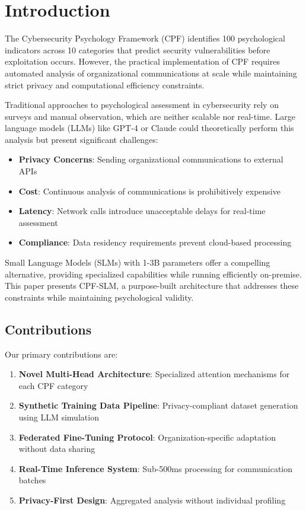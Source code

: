 \documentclass[11pt,a4paper]{article}
\begin{document}
\vspace{1cm}

\section{Introduction}

The Cybersecurity Psychology Framework (CPF) identifies 100 psychological indicators across 10 categories that predict security vulnerabilities before exploitation occurs. However, the practical implementation of CPF requires automated analysis of organizational communications at scale while maintaining strict privacy and computational efficiency constraints.

Traditional approaches to psychological assessment in cybersecurity rely on surveys and manual observation, which are neither scalable nor real-time. Large language models (LLMs) like GPT-4 or Claude could theoretically perform this analysis but present significant challenges:

\begin{itemize}
\item \textbf{Privacy Concerns}: Sending organizational communications to external APIs
\item \textbf{Cost}: Continuous analysis of communications is prohibitively expensive
\item \textbf{Latency}: Network calls introduce unacceptable delays for real-time assessment
\item \textbf{Compliance}: Data residency requirements prevent cloud-based processing
\end{itemize}

Small Language Models (SLMs) with 1-3B parameters offer a compelling alternative, providing specialized capabilities while running efficiently on-premise. This paper presents CPF-SLM, a purpose-built architecture that addresses these constraints while maintaining psychological validity.

\subsection{Contributions}

Our primary contributions are:

\begin{enumerate}
\item \textbf{Novel Multi-Head Architecture}: Specialized attention mechanisms for each CPF category
\item \textbf{Synthetic Training Data Pipeline}: Privacy-compliant dataset generation using LLM simulation
\item \textbf{Federated Fine-Tuning Protocol}: Organization-specific adaptation without data sharing
\item \textbf{Real-Time Inference System}: Sub-500ms processing for communication batches
\item \textbf{Privacy-First Design}: Aggregated analysis without individual profiling
\end{enumerate}
\end{document}

